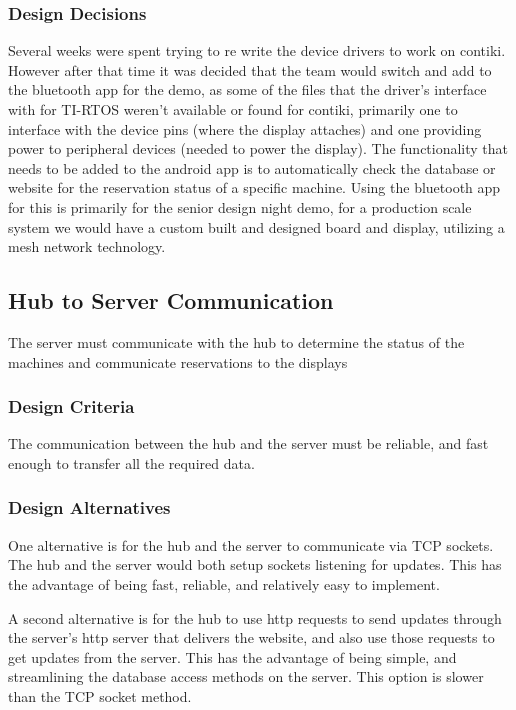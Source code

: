 \documentclass[PPFS.tex]{template/subfiles}
\begin{document}
\subsubsection{Design Decisions}
Several weeks were spent trying to re write the device drivers to work on contiki. However after that time it was decided that the team would switch and add to the bluetooth app for the demo, as some of the files that the driver's interface with for TI-RTOS weren't available or found for contiki, primarily one to interface with the device pins (where the display attaches) and one providing power to peripheral devices (needed to power the display). The functionality that needs to be added to the android app is to automatically check the database or website for the reservation status of a specific machine. Using the bluetooth app for this is primarily for the senior design night demo, for a production scale system we would have a custom built and designed board and display, utilizing a mesh network technology. 

\subsection{Hub to Server Communication}
The server must communicate with the hub to determine the status of the machines and communicate reservations to the displays

\subsubsection{Design Criteria}
The communication between the hub and the server must be reliable, and fast enough to transfer all the required data.

\subsubsection{Design Alternatives}
One alternative is for the hub and the server to communicate via TCP sockets. The hub and the server would both setup sockets listening for updates. This has the advantage of being fast, reliable, and relatively easy to implement.

A second alternative is for the hub to use http requests to send updates through the server's http server that delivers the website, and also use those requests to get updates from the server. This has the advantage of being simple, and streamlining the database access methods on the server. This option is slower than the TCP socket method.
\end{document}
